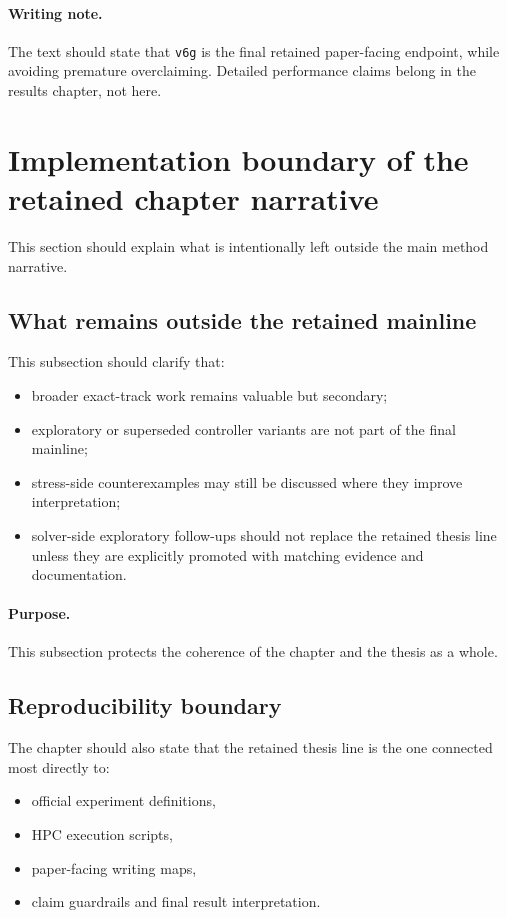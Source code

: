 \paragraph{Writing note.}
The text should state that \texttt{v6g} is the final retained paper-facing endpoint, while avoiding premature overclaiming. Detailed performance claims belong in the results chapter, not here.

\section{Implementation boundary of the retained chapter narrative}
\label{sec:arch_implementation_boundary}

This section should explain what is intentionally left outside the main method narrative.

\subsection{What remains outside the retained mainline}
\label{subsec:arch_excluded_branches}

This subsection should clarify that:
\begin{itemize}
    \item broader exact-track work remains valuable but secondary;
    \item exploratory or superseded controller variants are not part of the final mainline;
    \item stress-side counterexamples may still be discussed where they improve interpretation;
    \item solver-side exploratory follow-ups should not replace the retained thesis line unless they are explicitly promoted with matching evidence and documentation.
\end{itemize}

\paragraph{Purpose.}
This subsection protects the coherence of the chapter and the thesis as a whole.

\subsection{Reproducibility boundary}
\label{subsec:arch_reproducibility_boundary}

The chapter should also state that the retained thesis line is the one connected most directly to:
\begin{itemize}
    \item official experiment definitions,
    \item HPC execution scripts,
    \item paper-facing writing maps,
    \item claim guardrails and final result interpretation.
\end{itemize}

